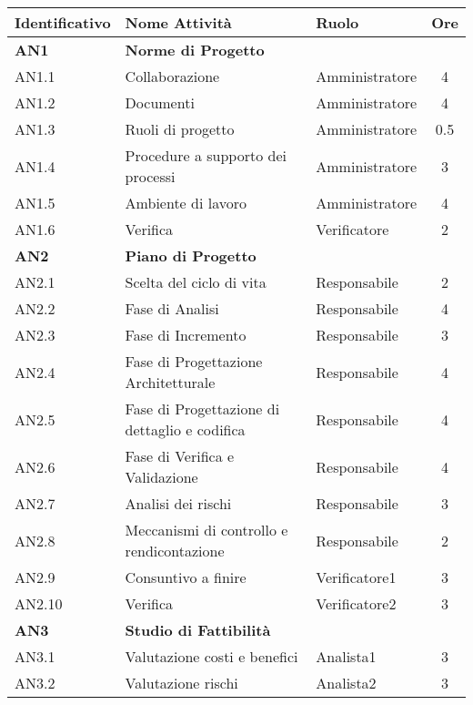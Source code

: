 \begin{longtable}{|l|l|l|c|}
  \endfirsthead
  \hline
  \textbf{Identificativo} &
  \textbf{Nome Attività} &
  \textbf{Ruolo} &
  \textbf{Ore}\\
  \endhead
  \hline
  \textbf{AN1} & \textbf{Norme di Progetto} &  &  \\
  \hline
  	{AN1.1} & Collaborazione & Amministratore  & 4\\
  	\hline
  	{AN1.2} & Documenti & Amministratore & 4\\
  	\hline
  	{AN1.3} & {Ruoli di progetto} & Amministratore &  0.5\\
  	\hline
  	{AN1.4} & {Procedure a supporto dei processi} & Amministratore  &  3\\
  	\hline
  	{AN1.5} & {Ambiente di lavoro} & Amministratore &  4\\
  	\hline
  	{AN1.6} & {Verifica} & Verificatore & 2 \\
  \hline
  \textbf{AN2} & \textbf{Piano di Progetto}  & & \\
    \hline
    	{AN2.1} & {Scelta del ciclo di vita} & Responsabile &  2\\
    	\hline
    	{AN2.2} & {Fase di Analisi} & Responsabile& 4 \\
    	\hline
    	{AN2.3} & {Fase di Incremento} & Responsabile& 3 \\
    	\hline
    	{AN2.4} & {Fase di Progettazione Architetturale} & Responsabile &   4\\
    	\hline
    	{AN2.5} & {Fase di Progettazione di dettaglio e codifica} & Responsabile  &  4\\
    	\hline
    	{AN2.6} & {Fase di Verifica e Validazione} & Responsabile  &  4\\
    	\hline
    	{AN2.7} & {Analisi dei rischi} & Responsabile  &  3\\
    	\hline
    	{AN2.8} & {Meccanismi di controllo e rendicontazione} & Responsabile & 2\\
    	\hline
    	{AN2.9} & {Consuntivo a finire} & Verificatore1  & 3\\
    	\hline
    	{AN2.10} & {Verifica} & Verificatore2  & 3 \\
    \hline
    \textbf{AN3} & \textbf{Studio di Fattibilità}  & &  \\
      \hline
      	{AN3.1} & {Valutazione costi e benefici} & Analista1  & 3 \\
      	\hline
      	{AN3.2} & {Valutazione rischi} & Analista2 & 3\\
      	\hline

\end{longtable}
